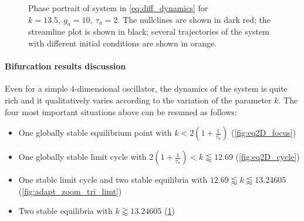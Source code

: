 \begin{figure}[!h]
        \caption{\label{fig:eq2D_cycle_after_collapse} Phase portrait of system in \eqref{eq:diff_dynamics} for $k=13.5,\ g_a=10,\ \tau_a=2$. The nullclines are shown in dark red; the streamline plot is shown in black; several trajectories of the system with different initial conditions are shown in orange. }
\end{figure}

\paragraph{Bifurcation results discussion}
Even for a simple 4-dimensional oscillator, the dynamics of the system is quite rich and it qualitatively varies according to the variation of the parameter $k$.
The four most important situations above can be resumed as follows:
\begin{itemize}
    \item One globally stable equilibrium point with $k<2(1+\frac{1}{\tau_a})$ (\cref{fig:eq2D_focus})
    \item One globally stable limit cycle with $2(1+\frac{1}{\tau_a}) < k \lessapprox 12.69$ (\cref{fig:eq2D_cycle})
    \item One stable limit cycle and two stable equilibria with $12.69 \lessapprox k \lessapprox 13.24605$ (\cref{fig:adapt_zoom_tri_limt})
    \item Two stable equilibria with $k \gtrapprox 13.24605$ (\cref{fig:eq2D_cycle_after_collapse})
\end{itemize}

